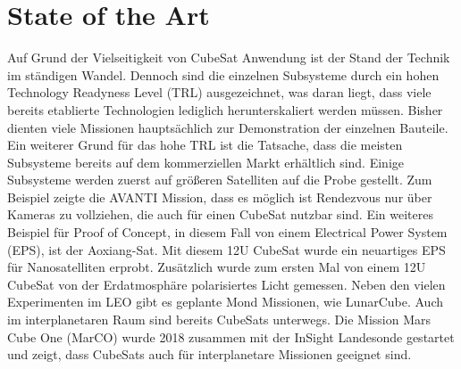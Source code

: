 		\section{State of the Art}
Auf Grund der Vielseitigkeit von CubeSat Anwendung ist der Stand der Technik im ständigen Wandel. Dennoch sind die einzelnen Subsysteme durch ein hohen Technology Readyness Level (TRL) ausgezeichnet, was daran liegt, dass viele bereits etablierte Technologien lediglich herunterskaliert werden müssen.
Bisher dienten viele Missionen hauptsächlich zur Demonstration der einzelnen Bauteile. Ein weiterer Grund für das hohe TRL ist die Tatsache, dass die meisten Subsysteme bereits auf dem kommerziellen Markt erhältlich sind.
Einige Subsysteme werden zuerst auf größeren Satelliten auf die Probe gestellt. Zum Beispiel zeigte die AVANTI Mission, dass es möglich ist Rendezvous nur über Kameras zu vollziehen, die auch für einen CubeSat nutzbar sind. Ein weiteres Beispiel für Proof of Concept, in diesem Fall von einem Electrical Power System (EPS), ist der Aoxiang-Sat. Mit diesem 12U CubeSat wurde ein neuartiges EPS für Nanosatelliten erprobt. Zusätzlich wurde zum ersten Mal von einem 12U CubeSat von der Erdatmosphäre polarisiertes Licht gemessen.
Neben den vielen Experimenten im LEO gibt es geplante Mond Missionen, wie LunarCube. Auch im interplanetaren Raum sind bereits CubeSats unterwegs. Die Mission Mars Cube One (MarCO) wurde 2018 zusammen mit der InSight Landesonde gestartet und zeigt, dass CubeSats auch für interplanetare Missionen geeignet sind.


